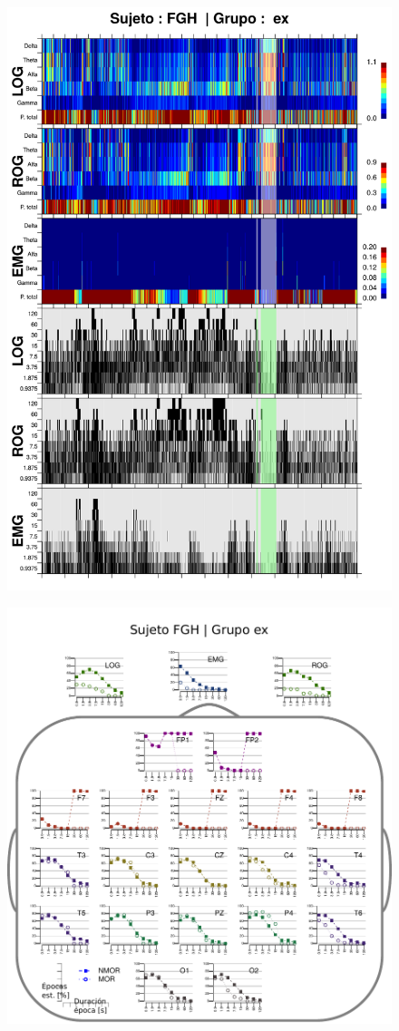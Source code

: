 \begin{figure}
\centering
\includegraphics[width=0.9\linewidth]
{./img_resultados/FGHSUE_combinado_.png} 
\end{figure}

\begin{figure}
\centering
\includegraphics[width=.9\linewidth]{./img_resultados/cabeza_FGH.pdf}
\end{figure}


